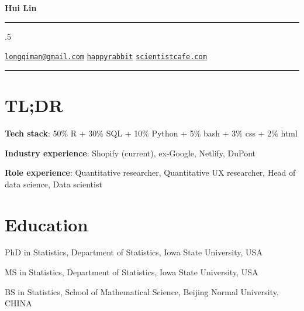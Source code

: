 \documentclass[11pt,]{article}
\providecommand{\tightlist}{%
  \setlength{\itemsep}{0pt}\setlength{\parskip}{0pt}}
\renewenvironment{itemize}{
  \begin{list}{}{
    \setlength{\leftmargin}{1.5em}
  }
}{
  \end{list}
}
\begin{document}
\centerline{\huge \bf Hui Lin}

\vspace{2 mm}

\hrule

\vspace{2 mm}



\moveleft.5\hoffset\centerline{ \faEnvelopeO \hspace{1 mm} \href{mailto:}{\tt \href{mailto:longqiman@gmail.com}{\nolinkurl{longqiman@gmail.com}}} \hspace{1 mm}  \faGithub \hspace{1 mm} \href{http://github.com/happyrabbit}{\tt happyrabbit} \hspace{1 mm}    \faGlobe \hspace{1 mm} \href{http://scientistcafe.com}{\tt scientistcafe.com}   }

\vspace{2 mm}

\hrule


\hypertarget{tldr}{%
\section{TL;DR}\label{tldr}}

\begin{itemize}
\tightlist
\item
  \textbf{Tech stack}: 50\% R + 30\% SQL + 10\% Python + 5\% bash + 3\%
  css + 2\% html
\item
  \textbf{Industry experience}: Shopify (current), ex-Google, Netlify,
  DuPont
\item
  \textbf{Role experience}: Quantitative researcher, Quantitative UX
  researcher, Head of data science, Data scientist
\end{itemize}

\hypertarget{education}{%
\section{Education}\label{education}}

\begin{itemize}
\tightlist
\item
  PhD in Statistics, Department of Statistics, Iowa State University,
  USA
\item
  MS in Statistics, Department of Statistics, Iowa State University, USA
\item
  BS in Statistics, School of Mathematical Science, Beijing Normal
  University, CHINA
\end{itemize}
\end{document}
